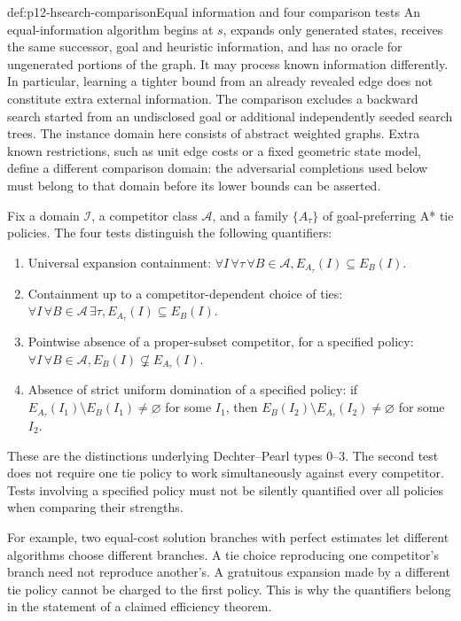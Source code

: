 \begin{hbdefinition}{def:p12-hsearch-comparison}{Equal information and four comparison tests}
An equal-information algorithm begins at \(s\), expands only generated
states, receives the same successor, goal and heuristic information, and
has no oracle for ungenerated portions of the graph. It may process known
information differently. In particular, learning a tighter bound from an
already revealed edge does not constitute extra external information.
The comparison excludes a backward search started from an undisclosed goal
or additional independently seeded search trees.
The instance domain here consists of abstract weighted graphs. Extra known
restrictions, such as unit edge costs or a fixed geometric state model,
define a different comparison domain: the adversarial completions used
below must belong to that domain before its lower bounds can be asserted.

Fix a domain \(\mathcal I\), a competitor class \(\mathcal A\), and
a family \(\{A_\tau\}\) of goal-preferring A* tie policies. The four
tests distinguish the following quantifiers:
\begin{enumerate}
\item Universal expansion containment:
 \(\forall I\,\forall\tau\,\forall B\in\mathcal A,
 E_{A_\tau}(I)\subseteq E_B(I)\).
\item Containment up to a competitor-dependent choice of ties:
 \(\forall I\,\forall B\in\mathcal A\,\exists\tau,
 E_{A_\tau}(I)\subseteq E_B(I)\).
\item Pointwise absence of a proper-subset competitor, for a specified
 policy: \(\forall I\,\forall B\in\mathcal A,
 E_B(I)\not\subsetneq E_{A_\tau}(I)\).
\item Absence of strict uniform domination of a specified policy:
 if \(E_{A_\tau}(I_1)\setminus E_B(I_1)\ne\varnothing\) for some
 \(I_1\), then
 \(E_B(I_2)\setminus E_{A_\tau}(I_2)\ne\varnothing\) for some
 \(I_2\).
\end{enumerate}
These are the distinctions underlying Dechter--Pearl types 0--3.
The second test does not require one tie policy to work simultaneously
against every competitor. Tests involving a specified policy must not be
silently quantified over all policies when comparing their strengths.
\end{hbdefinition}

For example, two equal-cost solution branches with perfect estimates let
different algorithms choose different branches. A tie choice reproducing
one competitor's branch need not reproduce another's. A gratuitous
expansion made by a different tie policy cannot be charged to the first
policy. This is why the quantifiers belong in the statement of a claimed
efficiency theorem.

